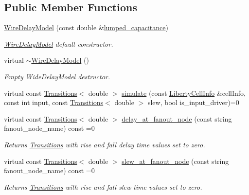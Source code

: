 \subsection*{Public Member Functions}
\begin{DoxyCompactItemize}
\item 
\hyperlink{classWireDelayModel_a0fd2defb581f6d8bcd67e5c935387d95}{Wire\-Delay\-Model} (const double \&\hyperlink{classWireDelayModel_a05f509843dfa07e17c9b6cc16ba9aaa0}{lumped\-\_\-capacitance})
\begin{DoxyCompactList}\small\item\em \hyperlink{classWireDelayModel}{Wire\-Delay\-Model} default constructor. \end{DoxyCompactList}\item 
virtual \hyperlink{classWireDelayModel_ad9103d46909b96ad4015c818dcd2988c}{$\sim$\-Wire\-Delay\-Model} ()
\begin{DoxyCompactList}\small\item\em Empty Wide\-Delay\-Model destructor. \end{DoxyCompactList}\item 
virtual const \hyperlink{classTransitions}{Transitions}$<$ double $>$ \hyperlink{classWireDelayModel_a8375f713365be98c03672dbeb28eb930}{simulate} (const \hyperlink{structLibertyCellInfo}{Liberty\-Cell\-Info} \&cell\-Info, const int input, const \hyperlink{classTransitions}{Transitions}$<$ double $>$ slew, bool is\-\_\-input\-\_\-driver)=0
\item 
virtual const \hyperlink{classTransitions}{Transitions}$<$ double $>$ \hyperlink{classWireDelayModel_a45a83dd192bcbf2a70ee13899256fe0d}{delay\-\_\-at\-\_\-fanout\-\_\-node} (const string fanout\-\_\-node\-\_\-name) const =0
\begin{DoxyCompactList}\small\item\em Returns \hyperlink{classTransitions}{Transitions} with rise and fall delay time values set to zero. \end{DoxyCompactList}\item 
virtual const \hyperlink{classTransitions}{Transitions}$<$ double $>$ \hyperlink{classWireDelayModel_adaf486017e2ad91a900a9bef4e6f9340}{slew\-\_\-at\-\_\-fanout\-\_\-node} (const string fanout\-\_\-node\-\_\-name) const =0
\begin{DoxyCompactList}\small\item\em Returns \hyperlink{classTransitions}{Transitions} with rise and fall slew time values set to zero. \end{DoxyCompactList}\item 

\end{DoxyCompactItemize}
